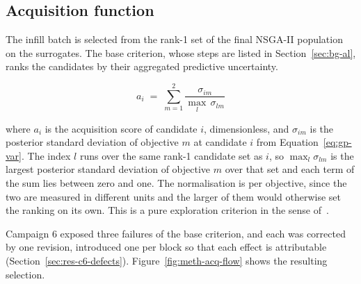 \subsection{Acquisition function}
\label{sec:meth-acq}

The infill batch is selected from the rank-1 set of the final NSGA-II
population on the surrogates. The base criterion, whose steps are
listed in Section~\ref{sec:bg-al}, ranks the candidates by their
aggregated predictive uncertainty.

\begin{equation}
a_i \;=\; \sum_{m=1}^{2} \frac{\sigma_{im}}{\max_{l}\,\sigma_{lm}}
\label{eq:acq-score}
\end{equation}

\noindent where $a_i$ is the acquisition score of candidate $i$,
dimensionless, and $\sigma_{im}$ is the posterior standard deviation of
objective $m$ at candidate $i$ from Equation~\eqref{eq:gp-var}. The
index $l$ runs over the same rank-1 candidate set as $i$, so
$\max_l \sigma_{lm}$ is the largest posterior standard deviation of
objective $m$ over that set and each term of the sum lies between zero
and one. The normalisation is per objective, since the two are measured
in different units and the larger of them would otherwise set the
ranking on its own. This is a pure exploration criterion in the sense
of~\cite{forrester_book_2008}.

Campaign 6 exposed three failures of the base criterion, and each was
corrected by one revision, introduced one per block so that each effect
is attributable (Section~\ref{sec:res-c6-defects}).
Figure~\ref{fig:meth-acq-flow} shows the resulting selection.

